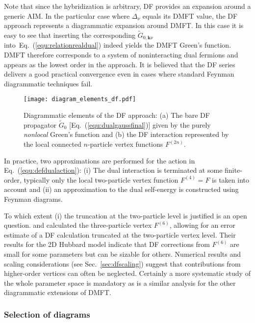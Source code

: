 \documentclass[rmp,aps,reprint,amsmath,amssymb,superscriptaddress,showpacs,nofootinbib]{revtex4-1}
\begin{document}
Note that since the hybridization is arbitrary, DF provides an expansion around a generic AIM. In the particular case where $\Delta_{\nu}$ equals its DMFT value, the DF approach represents a diagrammatic expansion around DMFT.
In this case it is easy to see that inserting the corresponding $\widetilde{G}_{0,\mathbf{k}\nu}$ into~Eq.~(\ref{equ:relationrealdual}) indeed yields the DMFT Green's function. DMFT therefore corresponds to a system of noninteracting dual fermions and appears as the lowest order in the approach. It is believed that the DF series delivers a good practical convergence even in cases where standard Feynman diagrammatic techniques fail.

\begin{figure}[t!]
  \centering
  \texttt{[image: diagram\_elements\_df.pdf]}
    \caption{Diagrammatic elements of the DF approach: (a) The bare DF propagator $\widetilde{G}_0$ [Eq.~(\ref{equ:dualgaussfinal})] given by the purely {\sl nonlocal} Green's function and (b) the DF interaction represented by the local connected $n$-particle vertex functions $F^{(2n)}$.}
  \label{fig:dfdiagramelements}
\end{figure}

In practice, two approximations are performed for the action in Eq.~(\ref{equ:defdualaction}): (i) The dual interaction is terminated at some finite-order, typically only the local two-particle vertex function $F^{(4)}=F$ is taken into account and (ii) an approximation to the dual self-energy is constructed using Feynman diagrams. 

To which extent (i) the truncation at the two-particle level is justified is an open question.   and  calculated the three-particle vertex $F^{(6)}$, allowing for an error estimate of a DF calculation truncated at the two-particle vertex level. Their results for the 2D Hubbard model indicate that  DF corrections from $F^{(6)}$ are small for some parameters but can be sizable for others. Numerical results and scaling considerations (see Sec.~\ref{sec:dfscaling}) suggest that contributions from higher-order vertices can often be neglected. Certainly a more systematic study of the whole parameter space is mandatory as is a similar analysis for the other diagrammatic extensions of DMFT.


\subsubsection{Selection of diagrams}
\label{sec:diagramchoice}
\end{document}
